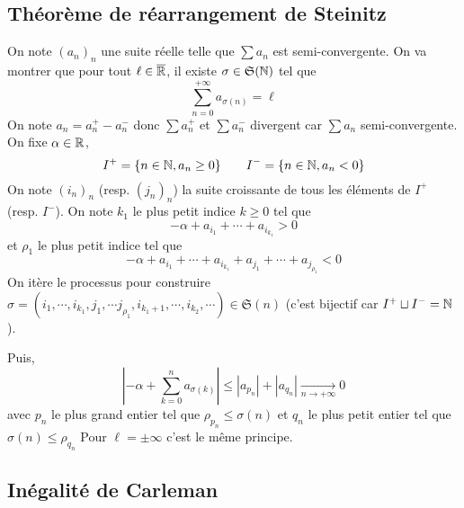 \subsection{Théorème de réarrangement de Steinitz}


On note $(a_n)_n$ une suite réelle telle que $\sum a_n$ est semi-convergente. On va montrer que pour tout $\ell\in\overline{\mathbb R}$, il existe $\sigma\in\mathfrak S(\mathbb N)$ tel que \[
    \sum_{n=0}^{+\infty}a_{\sigma(n)}=\ell
\]
On note $a_n=a_n^+-a_n^-$ donc $\sum a_n^+$ et $\sum a_n^-$ divergent car $\sum a_n$ semi-convergente. On fixe $\alpha\in\mathbb R$, \[I^+=\{n\in\mathbb N, a_n\geq 0\}\qquad I^-=\{n\in\mathbb N, a_n<0\}\]
On note $(i_n)_n$ (resp. $(j_n)_n$) la suite croissante de tous les éléments de $I^+$ (resp. $I^-$).
On note $k_1$ le plus petit indice $k\geq 0$ tel que \[
    -\alpha+a_{i_1}+\cdots +a_{i_{k_1}}>0
\]
et $\rho_1$ le plus petit indice tel que \[
    -\alpha+a_{i_1}+\cdots +a_{i_{k_1}}+a_{j_1}+\cdots +a_{j_{\rho_1}}<0
\]
On itère le processus pour construire $\sigma=(i_1, \cdots, i_{k_1}, j_1, \cdots j_{\rho_1}, i_{k_1+1}, \cdots, i_{k_2}, \cdots)\in\mathfrak S(n)$ (c'est bijectif car $I^+\sqcup I^-=\mathbb N$).

Puis, \[
    \left| -\alpha+\sum_{k=0}^na_{\sigma(k)} \right|\leq |a_{p_n}|+|a_{q_n}|\xrightarrow[n\to+\infty]{}0
\]
avec $p_n$ le plus grand entier tel que $\rho_{p_n}\leq \sigma(n)$ et $q_n$ le plus petit entier tel que $\sigma(n)\leq \rho_{q_n}$
Pour $\ell=\pm\infty$ c'est le même principe.

\subsection{Inégalité de Carleman}


